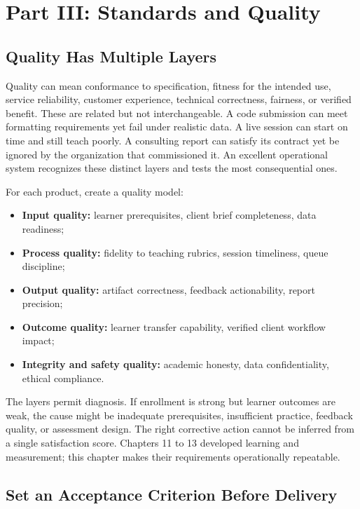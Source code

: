 \section*{Part III: Standards and Quality}

\subsection{Quality Has Multiple Layers}
\label{sec:multiple_quality_layers}

Quality can mean conformance to specification, fitness for the intended use, service reliability, customer experience, technical correctness, fairness, or verified benefit. These are related but not interchangeable. A code submission can meet formatting requirements yet fail under realistic data. A live session can start on time and still teach poorly. A consulting report can satisfy its contract yet be ignored by the organization that commissioned it. An excellent operational system recognizes these distinct layers and tests the most consequential ones.

For each product, create a quality model:
\begin{itemize}
    \item \textbf{Input quality:} learner prerequisites, client brief completeness, data readiness;
    \item \textbf{Process quality:} fidelity to teaching rubrics, session timeliness, queue discipline;
    \item \textbf{Output quality:} artifact correctness, feedback actionability, report precision;
    \item \textbf{Outcome quality:} learner transfer capability, verified client workflow impact;
    \item \textbf{Integrity and safety quality:} academic honesty, data confidentiality, ethical compliance.
\end{itemize}

The layers permit diagnosis. If enrollment is strong but learner outcomes are weak, the cause might be inadequate prerequisites, insufficient practice, feedback quality, or assessment design. The right corrective action cannot be inferred from a single satisfaction score. Chapters 11 to 13 developed learning and measurement; this chapter makes their requirements operationally repeatable.

\subsection{Set an Acceptance Criterion Before Delivery}
\label{sec:acceptance_criteria}

